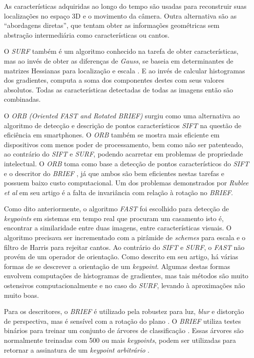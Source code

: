   As características adquiridas ao longo do tempo são usadas para reconstruir suas localizações no espaço 3D e o movimento da câmera. Outra alternativa são as “abordagens diretas”, que tentam obter as informações geométricas sem abstração intermediária como características ou cantos.

O \textit{SURF}\cite{SURF} também é um algoritmo conhecido na tarefa de obter características, mas ao invés de obter as diferenças de \textit{Gauss}, se baseia em determinantes de matrizes Hessianas para localização e escala \cite{Hessian}. E ao invés de calcular histogramas dos gradientes, computa a soma dos componentes destes com seus valores absolutos. Todas as características detectadas de todas as imagens então são combinadas.

O \textit{ORB (Oriented FAST and Rotated BRIEF)} surgiu como uma alternativa ao algoritmo de detecção e descrição de pontos característicos \textit{SIFT} na questão de eficiência em smartphones. O \textit{ORB} também se mostra mais eficiente em dispositivos com menos poder de processamento, bem como não ser patenteado, ao contrário do \textit{SIFT} e \textit{SURF}, podendo acarretar em problemas de propriedade intelectual. O \textit{ORB} toma como base a detecção de pontos característicos do \textit{SIFT} e o descritor do \textit{BRIEF} \cite{ORB-Artigo}, já que ambos são bem eficientes nestas tarefas e possuem baixo custo computacional. Um dos problemas demonstrados por \textit{Rublee et al}\cite{ORB-Artigo} em seu artigo é a falta de invariância com relação à rotação no \textit{BRIEF}.

Como dito anteriormente, o algoritmo \textit{FAST} foi escolhido para detecção de \textit{keypoints} em sistemas em tempo real que procuram um casamento isto é, encontrar a similaridade entre duas imagens, entre características visuais. O algoritmo precisava ser incrementado com a pirâmide de \textit{schemes} para escala\cite{ORB-Artigo} e o filtro de Harris\cite{ORB-Artigo} para rejeitar cantos. Ao contrário do \textit{SIFT} e \textit{SURF}, o \textit{FAST} não provém de um operador de orientação. Como descrito em seu artigo, há várias formas de se descrever a orientação de um \textit{keypoint}. Algumas destas formas envolvem computações de histogramas de gradientes, mas tais métodos são muito ostensivos computacionalmente e no caso do \textit{SURF}, levando à aproximações não muito boas.

Para os descritores, o \textit{BRIEF} é utilizado pela robustez para luz, \textit{blur} e distorção de perspectiva, mas é sensível com a rotação do plano \cite{ORB-Artigo}. O \textit{BRIEF} utiliza testes binários para treinar um conjunto de árvores de classificação \cite{ORB-Artigo}. Essas árvores são normalmente treinadas com 500 ou mais \textit{keypoints}, podem ser utilizadas para retornar a assinatura de um \textit{keypoint arbitrário} \cite{ORB-Artigo}.

